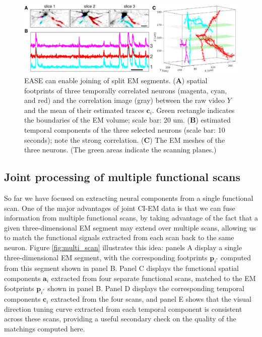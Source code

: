 \documentclass[10pt,letterpaper]{article}
\begin{document}
\begin{figure}[t!]
\centering
\includegraphics[width=1\textwidth]{Figs/fig_example_merge.pdf}
\caption{EASE can enable joining of split EM segments. (\textbf{A}) spatial footprints of three temporally correlated neurons (magenta, cyan, and red) and the correlation image (gray) between the raw video $Y$ and the mean of their estimated traces $\bm{c}_i$. Green rectangle indicates the boundaries of the EM volume; scale bar: 20 um. (\textbf{B}) estimated temporal components of the three selected neurons (scale bar: 10 seconds); note the strong correlation. (\textbf{C}) The EM meshes of the three neurons. (The green areas indicate the scanning planes.) } \label{fig:merge}
\end{figure}

\subsection{Joint processing of multiple functional scans}

So far we have focused on extracting neural components from a single functional scan.  One of the major advantages of joint CI-EM data is that we can fuse information from multiple functional scans, by taking advantage of the fact that a given three-dimensional EM segment may extend over multiple scans, allowing us to match the functional signals extracted from each scan back to the same neuron.  Figure \ref{fig:multi_scan} illustrates this idea: panels A display a single three-dimensional EM segment, with the corresponding footprints $\bm{p}_{i^*}$ computed from this segment shown in panel B.  Panel C displays the functional spatial components $\bm{a}_i$ extracted from four separate functional scans, matched to the EM footprints $\bm{p}_{i^*}$ shown in panel B.  Panel D displays the corresponding temporal components $\bm{c}_i$ extracted from the four scans, and panel E shows that the visual direction tuning curve extracted from each temporal component is consistent across these scans, providing a useful secondary check on the quality of the matchings computed here.
\end{document}
